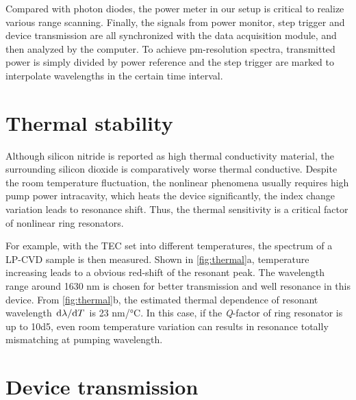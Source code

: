 Compared with photon diodes, the power meter in our setup is critical to realize various range scanning.  Finally, the signals from power monitor, step trigger and device transmission are all synchronized with the data acquisition module, and then analyzed by the computer. To achieve pm-resolution spectra, transmitted power is simply divided by power reference and the step trigger are marked to interpolate wavelengths in the certain time interval.


\section{Thermal stability}

\begin{figure}
	\centering
	
	\label{fig:thermal}
\end{figure}

Although silicon nitride is reported as high thermal conductivity material, the surrounding silicon dioxide is comparatively worse thermal conductive. Despite the room temperature fluctuation, the nonlinear phenomena usually requires high pump power intracavity, which heats the device significantly, the index change variation leads to resonance shift. Thus, the thermal sensitivity is a critical factor of nonlinear ring resonators.

For example, with the TEC set into different temperatures, the spectrum of a LP-CVD sample is then measured. Shown in \autoref{fig:thermal}a, temperature increasing leads to a obvious red-shift of the resonant peak. The wavelength range around 1630 nm is chosen for better transmission and well resonance in this device. From \autoref{fig:thermal}b, the estimated thermal dependence of resonant wavelength $\dv*{\lambda}{T}$ is 23 \si{\nm/\celsius}. In this case, if the \textit{Q}-factor of ring resonator is up to \num{10d5}, even room temperature variation can results in resonance totally mismatching at pumping wavelength.

\section{Device transmission}

